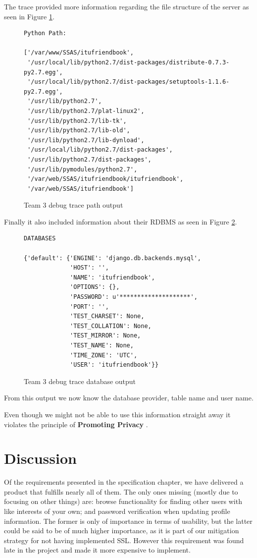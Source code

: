 \documentclass[a4paper]{article}
\begin{document}
The trace provided more information regarding the file structure of the server as seen in Figure \ref{fig:team_three_python}.
\begin{figure}[h!]
\caption{Team 3 debug trace path output}
\label{fig:team_three_python}
\begin{verbatim}
Python Path: 	

['/var/www/SSAS/itufriendbook',
 '/usr/local/lib/python2.7/dist-packages/distribute-0.7.3-py2.7.egg',
 '/usr/local/lib/python2.7/dist-packages/setuptools-1.1.6-py2.7.egg',
 '/usr/lib/python2.7',
 '/usr/lib/python2.7/plat-linux2',
 '/usr/lib/python2.7/lib-tk',
 '/usr/lib/python2.7/lib-old',
 '/usr/lib/python2.7/lib-dynload',
 '/usr/local/lib/python2.7/dist-packages',
 '/usr/lib/python2.7/dist-packages',
 '/usr/lib/pymodules/python2.7',
 '/var/web/SSAS/itufriendbook/itufriendbook',
 '/var/web/SSAS/itufriendbook']
\end{verbatim}
\end{figure}

Finally it also included information about their RDBMS as seen in Figure \ref{fig:team_three_db}.
\begin{figure}[h!]
\caption{Team 3 debug trace database output}
\label{fig:team_three_db}
\begin{verbatim}
DATABASES 	

{'default': {'ENGINE': 'django.db.backends.mysql',
             'HOST': '',
             'NAME': 'itufriendbook',
             'OPTIONS': {},
             'PASSWORD': u'********************',
             'PORT': '',
             'TEST_CHARSET': None,
             'TEST_COLLATION': None,
             'TEST_MIRROR': None,
             'TEST_NAME': None,
             'TIME_ZONE': 'UTC',
             'USER': 'itufriendbook'}}
\end{verbatim}
\end{figure}

From this output we now know the database provider, table name and user name. 

Even though we might not be able to use this information straight away it violates the principle of \textbf{Promoting Privacy} \cite{princ}.

\section{Discussion}\label{sec:discussion}
Of the requirements presented in the specification chapter, we have delivered a product that fulfills nearly all of them. The only ones missing (mostly due to focusing on other things) are: browse functionality for finding other users with like interests of your own; and password verification when updating profile information. The former is only of importance in terms of usability, but the latter could be said to be of much higher importance, as it is part of our mitigation strategy for not having implemented SSL. However this requirement was found late in the project and made it more expensive to implement.
\end{document}
